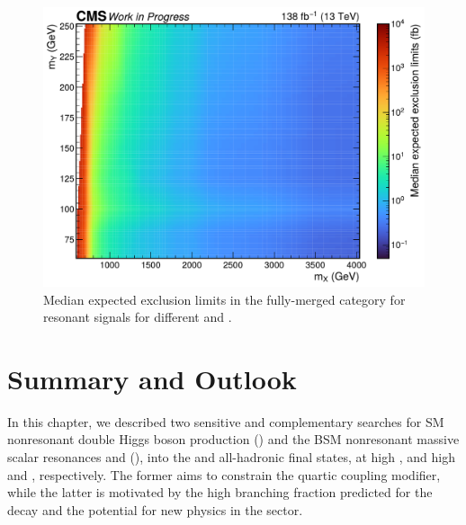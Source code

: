 \begin{figure}[hbt!]
\centering
\includegraphics[width=\textwidth]{figures/05-HH/results_res/mesh_50.0_turbo.pdf}
\caption{Median expected exclusion limits in the fully-merged category for resonant \XHYbbVVq signals for different \mx and \my.
\label{fig:05_results_xhy_xUL_fm}
}
\end{figure}




\section{Summary and Outlook}
\label{sec:05_outlook}

In this chapter, we described two sensitive and complementary searches for SM nonresonant double Higgs boson production (\HH) and the BSM nonresonant massive scalar resonances \PX and \PY (\XHY), into the \bbbar and \VV all-hadronic final states, at high \mHH, and high \mx and \my, respectively.
The former aims to constrain the \kapvv quartic coupling modifier, while the latter is motivated by the high branching fraction predicted for the \yvv decay and the potential for new physics in the \XHY sector.

